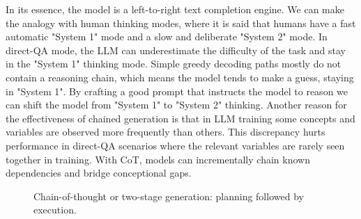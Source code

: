 In its essence, the model is a left-to-right text completion engine. We can make the analogy with human thinking 
modes, where it is said that humans have a fast automatic "System 1" mode and a slow and deliberate "System 2" mode\cite{yao2023treethoughtsdeliberateproblem}. 
In direct-QA mode, the LLM can underestimate the difficulty of the task\cite{wang2024chainofthoughtreasoningprompting} and stay in the "System 1" thinking mode.
Simple greedy decoding paths mostly do not contain a reasoning chain\cite{wang2024chainofthoughtreasoningprompting}, which means the model tends to make a guess, staying in "System 1".
By crafting a good prompt that instructs the model to reason we can shift the model from "System 1" to "System 2" thinking.
Another reason for the effectiveness of chained generation is that in LLM training
some concepts and variables are observed more frequently than others\cite{prystawski2023thinkstepstepreasoning}. 
This discrepancy hurts performance in direct-QA scenarios where the relevant
variables are rarely seen together in training. With CoT, models can incrementally chain known dependencies and bridge conceptional gaps.
\begin{figure}[ht]
    \centering
    \caption{Chain-of-thought or two-stage generation: planning followed by execution.}
    \label{fig:chain_generation}
\end{figure}

